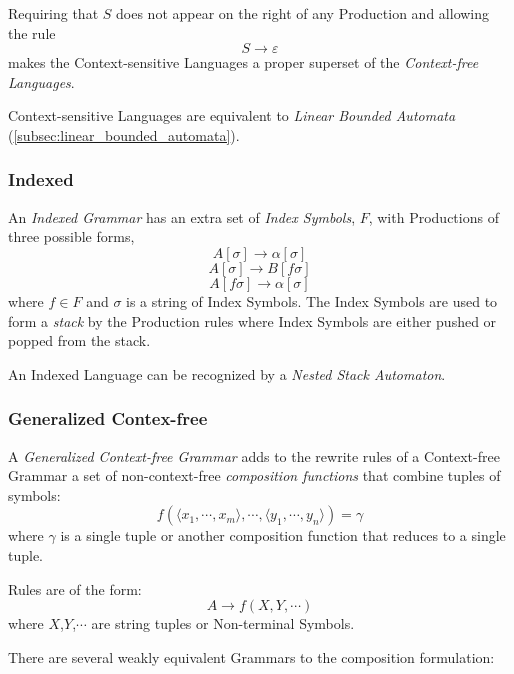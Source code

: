\documentclass{article}
\begin{document}
Requiring that $S$ does not appear on the right of any Production
and allowing the rule
\[
    S \rightarrow \varepsilon
\]
makes the Context-sensitive Languages a proper superset of the
\emph{Context-free Languages}.

Context-sensitive Languages are equivalent to \emph{Linear
Bounded Automata} (\ref{subsec:linear_bounded_automata}).

\subsubsection{Indexed}
An \emph{Indexed Grammar} has an extra set of \emph{Index Symbols},
$F$, with Productions of three possible forms,
\[
    A[\sigma] \rightarrow \alpha[\sigma]
\]\[
    A[\sigma] \rightarrow B[f\sigma]
\]\[
    A[f\sigma] \rightarrow \alpha[\sigma]
\]
where $f \in F$ and $\sigma$ is a string of Index Symbols. The Index
Symbols are used to form a \emph{stack} by the Production rules where
Index Symbols are either pushed or popped from the stack.

An Indexed Language can be recognized by a \emph{Nested Stack
  Automaton}\cite{aho69}.

\subsubsection{Generalized Contex-free}
A \emph{Generalized Context-free Grammar} adds to the rewrite rules of
a Context-free Grammar a set of non-context-free \emph{composition
  functions} that combine tuples of symbols:
\[
    f(\langle x_1,\cdots,x_m\rangle,\cdots,\langle
    y_1,\cdots,y_n\rangle)=\gamma
\]
where $\gamma$ is a single tuple or another composition function that
reduces to a single tuple.

Rules are of the form:
\[
    A \rightarrow f(X,Y,\cdots)
\]
where $X$,$Y$,$\cdots$ are string tuples or Non-terminal Symbols.

There are several weakly equivalent Grammars to the composition
formulation:
\end{document}
